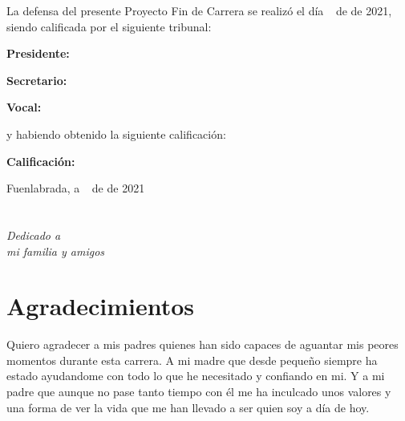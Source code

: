 \documentclass[a4paper, 12pt]{book}
\begin{document}
\vspace{1cm}
La defensa del presente Proyecto Fin de Carrera se realizó el día \qquad$\;\,$ de \qquad\qquad\qquad\qquad \newline de 2021, siendo calificada por el siguiente tribunal:


\vspace{0.5cm}
\textbf{Presidente:}

\vspace{1.2cm}
\textbf{Secretario:}

\vspace{1.2cm}
\textbf{Vocal:}


\vspace{1.2cm}
y habiendo obtenido la siguiente calificación:

\vspace{1cm}
\textbf{Calificación:}


\vspace{1cm}
\begin{flushright}
Fuenlabrada, a \qquad$\;\,$ de \qquad\qquad\qquad\qquad de 2021
\end{flushright}


\chapter*{}
\begin{flushright}
\textit{Dedicado a \\
mi familia y amigos}
\end{flushright}


\chapter*{Agradecimientos}

Quiero agradecer a mis padres quienes han sido capaces de aguantar mis peores momentos durante esta carrera. A mi madre que desde pequeño siempre ha estado ayudandome con todo lo que he necesitado y confiando en mi. Y a mi padre que aunque no pase tanto tiempo con él me ha inculcado unos valores y una forma de ver la vida que me han llevado a ser quien soy a día de hoy.
\end{document}
